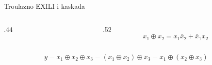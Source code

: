 \begin{frame}[label=01-s028]{Troulazno EXILI i kaskada}
\begin{columns}[T,onlytextwidth]
\begin{column}{.44\textwidth}
\centering
\end{column}
\begin{column}{.52\textwidth}
\[x_1\oplus x_2=x_1\bar{x}_2+\bar{x}_1x_2\]
\end{column}\end{columns}
\[y=x_1\oplus x_2\oplus x_3=(x_1\oplus x_2)\oplus x_3=x_1\oplus(x_2\oplus x_3)\]
\centering\par
\end{frame}
